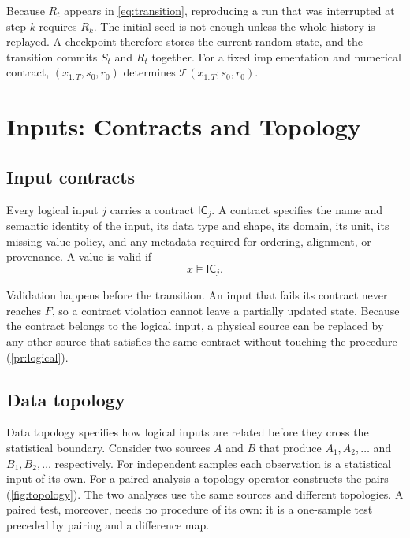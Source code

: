 \documentclass[11pt,a4paper]{article}
\theoremstyle{definition}
\theoremstyle{remark}
\newcommand{\Traj}{\mathcal{T}}
\newcommand{\InputContract}{\mathsf{IC}}
\begin{document}
Because $R_t$ appears in \eqref{eq:transition}, reproducing a run that
was interrupted at step $k$ requires $R_k$. The initial seed is not
enough unless the whole history is replayed. A checkpoint therefore
stores the current random state, and the transition commits $S_t$ and
$R_t$ together. For a fixed implementation and numerical contract,
$(x_{1:T},s_0,r_0)$ determines $\Traj(x_{1:T};s_0,r_0)$.

\section{Inputs: Contracts and Topology}
\label{sec:inputs}

\subsection{Input contracts}
\label{sec:contracts}

Every logical input $j$ carries a contract $\InputContract_j$. A contract
specifies the name and semantic identity of the input, its data type and
shape, its domain, its unit, its missing-value policy, and any metadata
required for ordering, alignment, or provenance. A value is valid if
\begin{equation}
x \models \InputContract_j .
\end{equation}

Validation happens before the transition. An input that fails its
contract never reaches $F$, so a contract violation cannot leave a
partially updated state. Because the contract belongs to the logical
input, a physical source can be replaced by any other source that
satisfies the same contract without touching the procedure
(\cref{pr:logical}).

\subsection{Data topology}
\label{sec:topology}

Data topology specifies how logical inputs are related before they cross
the statistical boundary. Consider two sources $A$ and $B$ that produce
$A_1,A_2,\ldots$ and $B_1,B_2,\ldots$ respectively. For independent
samples each observation is a statistical input of its own. For a paired
analysis a topology operator constructs the pairs
(\cref{fig:topology}). The two analyses use the same sources and
different topologies. A paired test, moreover, needs no procedure of its
own: it is a one-sample test preceded by pairing and a difference map.
\end{document}
